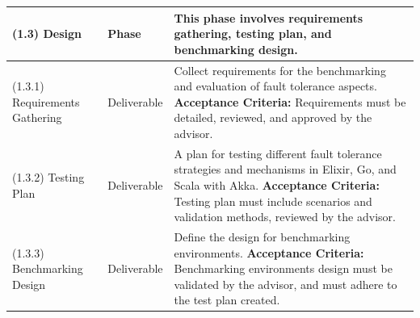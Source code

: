 \begin{longtable}{|p{3cm}|p{2.5cm}|p{8cm}|}
    (1.3) Design                   & Phase                 & This phase involves requirements gathering, testing plan, and benchmarking design.                                                                                                                                                                                                                                                                        \\ \hline
    (1.3.1) Requirements Gathering & Deliverable           & Collect requirements for the benchmarking and evaluation of fault tolerance aspects. \newline \textbf{Acceptance Criteria:} Requirements must be detailed, reviewed, and approved by the advisor.                                                                                                                                                         \\ \hline
    (1.3.2) Testing Plan           & Deliverable           & A plan for testing different fault tolerance strategies and mechanisms in Elixir, Go, and Scala with Akka. \newline \textbf{Acceptance Criteria:} Testing plan must include scenarios and validation methods, reviewed by the advisor.                                                                                                                    \\ \hline
    (1.3.3) Benchmarking Design    & Deliverable           & Define the design for benchmarking environments. \newline \textbf{Acceptance Criteria:} Benchmarking environments design must be validated by the advisor, and must adhere to the test plan created.                                                                                                                                                      \\ \hline
    \hline


\end{longtable}
